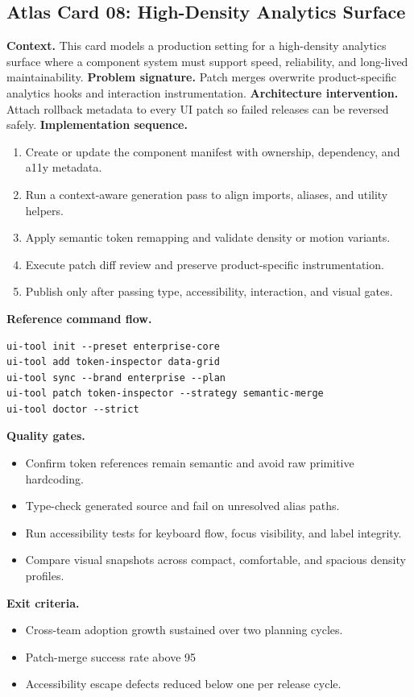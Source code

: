 \subsection*{Atlas Card 08: High-Density Analytics Surface}
\textbf{Context.} This card models a production setting for a high-density analytics surface where a component system must support speed, reliability, and long-lived maintainability.
\textbf{Problem signature.} Patch merges overwrite product-specific analytics hooks and interaction instrumentation.
\textbf{Architecture intervention.} Attach rollback metadata to every UI patch so failed releases can be reversed safely.
\textbf{Implementation sequence.}
\begin{enumerate}[leftmargin=*, itemsep=0.28em]
  \item Create or update the component manifest with ownership, dependency, and a11y metadata.
  \item Run a context-aware generation pass to align imports, aliases, and utility helpers.
  \item Apply semantic token remapping and validate density or motion variants.
  \item Execute patch diff review and preserve product-specific instrumentation.
  \item Publish only after passing type, accessibility, interaction, and visual gates.
\end{enumerate}
\textbf{Reference command flow.}
\begin{verbatim}
ui-tool init --preset enterprise-core
ui-tool add token-inspector data-grid
ui-tool sync --brand enterprise --plan
ui-tool patch token-inspector --strategy semantic-merge
ui-tool doctor --strict
\end{verbatim}
\textbf{Quality gates.}
\begin{itemize}[leftmargin=*, itemsep=0.24em]
  \item Confirm token references remain semantic and avoid raw primitive hardcoding.
  \item Type-check generated source and fail on unresolved alias paths.
  \item Run accessibility tests for keyboard flow, focus visibility, and label integrity.
  \item Compare visual snapshots across compact, comfortable, and spacious density profiles.
\end{itemize}
\textbf{Exit criteria.}
\begin{itemize}[leftmargin=*, itemsep=0.24em]
  \item Cross-team adoption growth sustained over two planning cycles.
  \item Patch-merge success rate above 95%
  \item Accessibility escape defects reduced below one per release cycle.
\end{itemize}
\clearpage
